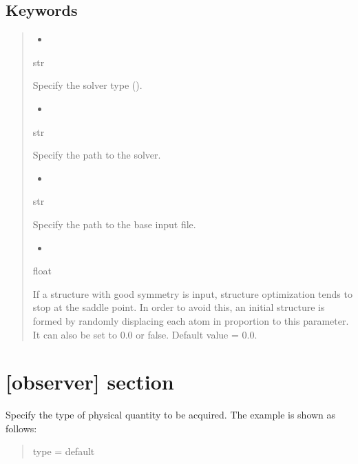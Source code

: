 \documentclass[letterpaper,10pt,english]{sphinxmanual}
\begin{document}
\subsection{Keywords}
\label{\detokenize{file_specification/parameter_solver:keywords}}\begin{quote}
\begin{itemize}
\item {} 

\end{itemize}

 str

Specify the solver type ().
\begin{itemize}
\item {} 

\end{itemize}

 str

Specify the path to the solver.
\begin{itemize}
\item {} 

\end{itemize}

 str

Specify the path to the base input file.
\begin{itemize}
\item {} 

\end{itemize}

 float

If a structure with good symmetry is input, structure optimization tends to stop at the saddle point. In order to avoid this, an initial structure is formed by randomly displacing each atom in proportion to this parameter. It can also be set to 0.0 or false. Default value = 0.0.
\end{quote}


\section{{[}observer{]} section}
\label{\detokenize{file_specification/parameter_observer:observer-section}}\label{\detokenize{file_specification/parameter_observer::doc}}
Specify the type of physical quantity to be acquired.
The example is shown as follows:
\begin{quote}

\begin{sphinxVerbatim}[commandchars=\\\{\}]
[observer]
type = \PYGZsq{}default\PYGZsq{}
\end{sphinxVerbatim}
\end{quote}
\end{document}
